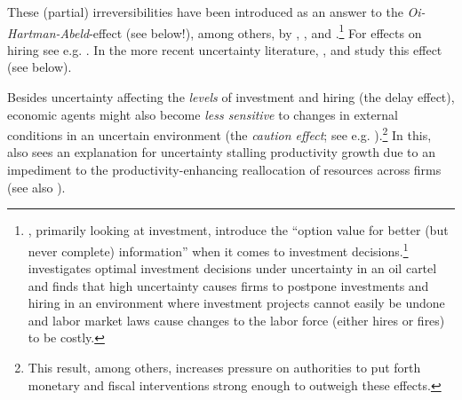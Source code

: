 \documentclass[a4paper,11pt,listof=nochaptergap,oneside,pointednumbers,bibtotoc,bigheadings,liststotoc]{scrbook}
\theoremstyle{mysatz}
\theoremstyle{mydefinition}
\theoremstyle{mybemerkung}
\begin{document}
These (partial) irreversibilities have been introduced as an answer to the \textit{Oi-Hartman-Abeld}-effect (see below!), among others, by \citet{dixitandpindyck:94}, \citet{bernanke:83}, \citet{abelandeberly:96} and \citet{siegel:86}.\footnote{\citet{dixitandpindyck:94}, primarily looking at investment, introduce the ``option value for better (but never complete) information'' when it comes to investment decisions.\footnote{In fact, the term 'options-effect' in this context borrows from an analogy of option theory in finance.} \citet{bernanke:83} investigates optimal investment decisions under uncertainty in an oil cartel and finds that high uncertainty causes firms to postpone investments and hiring in an environment where investment projects cannot easily be undone and labor market laws cause changes to the labor force (either hires or fires) to be costly.} For effects on hiring see e.g. \citet{bentoliliaandbertola:90}. In the more recent uncertainty literature, \citet{bloom:09}, \citet{bloometal:12} and \citet{schaal:17} study this effect (see below).

Besides uncertainty affecting the \textit{levels} of investment and hiring (the delay effect), economic agents might also become \textit{less sensitive} to changes in external conditions in an uncertain environment (the \textit{caution effect}; see e.g. \citealp{bloom:09}).\footnote{This result, among others, increases pressure on authorities to put forth monetary and fiscal interventions strong enough to outweigh these effects.} In this, \citet{bloom:14} also sees an explanation for uncertainty stalling productivity growth due to an impediment to the productivity-enhancing reallocation of resources across firms (see also \citealp{bloometal:12}).\\
\end{document}
